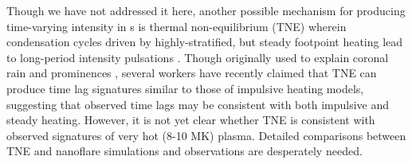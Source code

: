 Though we have not addressed it here, another possible mechanism for producing time-varying intensity in \AR s is thermal non-equilibrium (TNE) wherein condensation cycles driven by highly-stratified, but steady footpoint heating lead to long-period intensity pulsations \citep{kuin_thermal_1982}. Though originally used to explain coronal rain \citep{antolin_coronal_2010,antolin_multithermal_2015,auchere_coronal_2018} and prominences \citep{antiochos_model_1991}, several workers \citep{mok_three-dimensional_2016,winebarger_investigation_2016,froment_long-period_2017,winebarger_identifying_2018,froment_occurrence_2018} have recently claimed that TNE can produce time lag signatures similar to those of impulsive heating models, suggesting that observed time lags may be consistent with both impulsive and steady heating. However, it is not yet clear whether TNE is consistent with observed signatures of very hot (8-10 MK) plasma. Detailed comparisons between TNE and nanoflare simulations and observations are desperately needed.
